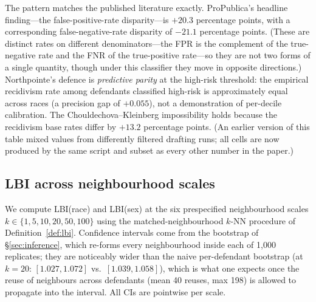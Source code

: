 \documentclass[11pt]{article}
\begin{document}
The pattern matches the published literature exactly. ProPublica's
headline finding---the false-positive-rate disparity---is
$+20.3$ percentage points, with a corresponding false-negative-rate
disparity of $-21.1$ percentage points. (These are distinct rates on
different denominators---the FPR is the complement of the true-negative
rate and the FNR of the true-positive rate---so they are not two forms
of a single quantity, though under this classifier they move in opposite
directions.) Northpointe's defence is \emph{predictive parity} at the
high-risk threshold: the empirical recidivism rate among defendants
classified high-risk is approximately equal across races (a precision
gap of $+0.055$), not a demonstration of per-decile calibration. The
Chouldechova--Kleinberg impossibility holds because the recidivism base
rates differ by $+13.2$ percentage points. (An earlier version of
this table mixed values from differently filtered drafting runs; all
cells are now produced by the same script and subset as every other
number in the paper.)

\subsection{LBI across neighbourhood scales}
\label{sec:lbiresults}

We compute LBI(race) and LBI(sex) at the six prespecified
neighbourhood scales $k \in \{1, 5, 10, 20, 50, 100\}$ using the
matched-neighbourhood $k$-NN procedure of Definition~\ref{def:lbi}.
Confidence intervals come from the bootstrap of
\S\ref{sec:inference}, which re-forms every neighbourhood inside each
of 1{,}000 replicates; they are noticeably wider than the naive
per-defendant bootstrap (at $k = 20$: $[1.027, 1.072]$ vs.\
$[1.039, 1.058]$), which is what one expects once the reuse of
neighbours across defendants (mean 40 reuses, max 198) is allowed to
propagate into the interval. All CIs are pointwise per scale.
\end{document}

